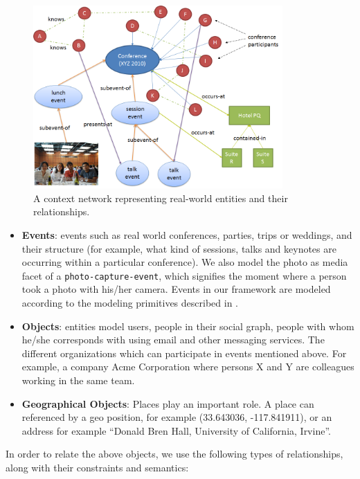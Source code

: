 \begin{figure}[h]
\centering
\includegraphics[width=0.85\textwidth]{media/chapter2/context-network-large.png}
\caption{A context network representing real-world entities and their relationships.}
\label{fig:context-network-large}
\end{figure}

\begin{itemize}
\item \textbf{Events}: events such as real world conferences, parties, trips or weddings, and their structure (for example, what kind of sessions, talks and keynotes are occurring within a particular conference). We also model the photo as media facet of a \texttt{photo-capture-event}, which signifies the moment where a person took a photo with his/her camera. Events in our framework are modeled according to the modeling primitives described in \cite{gupta2011managing, westermann2007toward}.

\item \textbf{Objects}: entities model users, people in their social graph, people with whom he/she corresponds with using email and other messaging services. The different organizations which can participate in events mentioned above. For example, a company Acme Corporation where persons X and Y are colleagues working in the same team.

\item \textbf{Geographical Objects}: Places play an important role. A place can referenced by a geo position, for example (33.643036, -117.841911), or an address for example ``Donald Bren Hall, University of California, Irvine''. 
\end{itemize}

In order to relate the above objects, we use the following types of relationships, along with their constraints and semantics:

